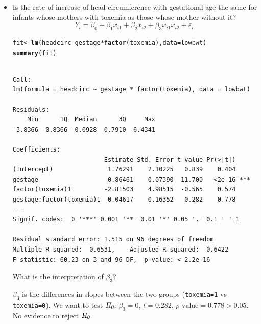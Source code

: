 \documentclass[oneside]{book}\usepackage[]{graphicx}\usepackage[svgnames]{xcolor}
\makeatletter
\newcommand{\hlopt}[1]{\textcolor[rgb]{0,0,0}{#1}}%
\newcommand{\hlstd}[1]{\textcolor[rgb]{0.345,0.345,0.345}{#1}}%
\newcommand{\hlkwb}[1]{\textcolor[rgb]{0.69,0.353,0.396}{#1}}%
\newcommand{\hlkwc}[1]{\textcolor[rgb]{0.333,0.667,0.333}{#1}}%
\newcommand{\hlkwd}[1]{\textcolor[rgb]{0.737,0.353,0.396}{\textbf{#1}}}%
\newenvironment{kframe}{%
 \def\at@end@of@kframe{}%
 \ifinner\ifhmode%
  \def\at@end@of@kframe{\end{minipage}}%
  \begin{minipage}{\columnwidth}%
 \fi\fi%
 \def\FrameCommand##1{\hskip\@totalleftmargin \hskip-\fboxsep
 \colorbox{shadecolor}{##1}\hskip-\fboxsep
     \hskip-\linewidth \hskip-\@totalleftmargin \hskip\columnwidth}%
 \MakeFramed {\advance\hsize-\width
   \@totalleftmargin\z@ \linewidth\hsize
   \@setminipage}}%
 {\par\unskip\endMakeFramed%
 \at@end@of@kframe}
\newenvironment{knitrout}{}{} %
\newcommand{\HN}{\textsl{H}_{\textsl{0}}}%
\makeatother
\begin{document}
\begin{itemize}
            $ \hat{\beta}_3=-1.41233 $. After adjustment of gestational age, the babies whose mothers had toxemia have smaller (by \qty{1.41}{\cm}) than
            those whose mothers did not. This difference is significant (test $ \HN $: $ \beta_2=0 $, $ p\text{-value}=0.0076<0.05$).
      \item Is the rate of increase of head circumference with gestational age the same
            for infants whose mothers with toxemia as those whose mother without it?
            \[ Y_i=\beta_0+\beta_1x_{i1}+\beta_2x_{i2}+\beta_3x_{i1}x_{i2}+\varepsilon_i. \]
\begin{knitrout}
\color{fgcolor}\begin{kframe}
\begin{alltt}
\hlstd{fit} \hlkwb{<-} \hlkwd{lm}\hlstd{(headcirc} \hlopt{~} \hlstd{gestage} \hlopt{*} \hlkwd{factor}\hlstd{(toxemia),} \hlkwc{data} \hlstd{= lowbwt)}
\hlkwd{summary}\hlstd{(fit)}
\end{alltt}
\begin{verbatim}

Call:
lm(formula = headcirc ~ gestage * factor(toxemia), data = lowbwt)

Residuals:
    Min      1Q  Median      3Q     Max 
-3.8366 -0.8366 -0.0928  0.7910  6.4341 

Coefficients:
                         Estimate Std. Error t value Pr(>|t|)    
(Intercept)               1.76291    2.10225   0.839    0.404    
gestage                   0.86461    0.07390  11.700   <2e-16 ***
factor(toxemia)1         -2.81503    4.98515  -0.565    0.574    
gestage:factor(toxemia)1  0.04617    0.16352   0.282    0.778    
---
Signif. codes:  0 '***' 0.001 '**' 0.01 '*' 0.05 '.' 0.1 ' ' 1

Residual standard error: 1.515 on 96 degrees of freedom
Multiple R-squared:  0.6531,	Adjusted R-squared:  0.6422 
F-statistic: 60.23 on 3 and 96 DF,  p-value: < 2.2e-16
\end{verbatim}
\end{kframe}
\end{knitrout}
            What is the interpretation of $ \beta_3 $?

            $ \beta_3 $ is the differences in slopes between the two groups (\texttt{toxemia=1} vs \texttt{toxemia=0}).
            We want to test $ \HN $: $ \beta_3=0 $, $ t=0.282 $, $ p\text{-value}=0.778>0.05 $. No evidence to reject $ \HN $.
\end{itemize}
\end{document}
